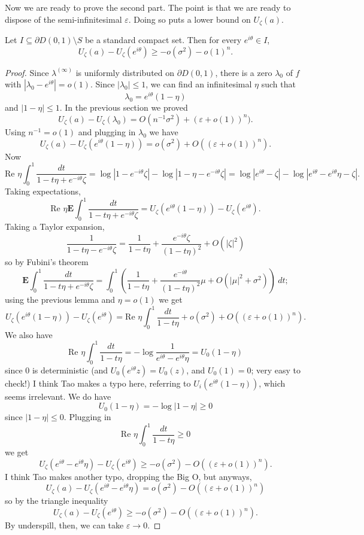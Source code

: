 \documentclass[12pt]{article}
\begin{document}
Now we are ready to prove the second part.
The point is that we are ready to dispose of the semi-infinitesimal $\varepsilon$.
Doing so puts a lower bound on $U_\zeta(a)$.
\begin{lemma}
Let $I \subseteq \partial D(0, 1) \setminus S$ be a standard compact set. Then for every $e^{i\theta} \in I$,
$$U_\zeta(a) - U_\zeta(e^{i\theta}) \geq -o(\sigma^2) - o(1)^n.$$
\end{lemma}
\begin{proof}
Since $\lambda^{(\infty)}$ is uniformly distributed on $\partial D(0, 1)$, there is a zero $\lambda_0$ of $f$ with $|\lambda_0 - e^{i\theta}| = o(1)$.
Since $|\lambda_0| \leq 1$, we can find an infinitesimal $\eta$ such that
$$\lambda_0 = e^{i\theta}(1 - \eta)$$
and $|1 - \eta| \leq 1$.
In the previous section we proved
$$U_\zeta(a) - U_\zeta(\lambda_0) = O(n^{-1}\sigma^2) + (\varepsilon + o(1))^n).$$
Using $n^{-1} = o(1)$ and plugging in $\lambda_0$ we have
$$U_\zeta(a) - U_\zeta(e^{i\theta}(1 - \eta)) = o(\sigma^2) + O((\varepsilon + o(1))^n).$$
Now
$$\text{Re } \eta \int_0^1 \frac{dt}{1 - t\eta + e^{-i\theta}\zeta} = \log |1 - e^{-i\theta}\zeta| - \log|1 - \eta - e^{-i\theta}\zeta| = \log|e^{i\theta} - \zeta| - \log|e^{i\theta} - e^{i\theta}\eta - \zeta|.$$
Taking expectations,
$$\text{Re }\eta \mathbf E\int_0^1 \frac{dt}{1 - t\eta + e^{-i\theta}\zeta} = U_\zeta(e^{i\theta}(1 - \eta)) - U_\zeta(e^{i\theta}).$$
Taking a Taylor expansion,
$$\frac{1}{1 - t\eta - e^{-i\theta}\zeta} = \frac{1}{1 - t\eta} + \frac{e^{-i\theta}\zeta}{(1 - t\eta)^2} + O(|\zeta|^2)$$
so by Fubini's theorem
$$\mathbf E\int_0^1 \frac{dt}{1 - t\eta + e^{-i\theta}\zeta} = \int_0^1 \left(\frac{1}{1 - t\eta} + \frac{e^{-i\theta}}{(1 - t\eta)^2}\mu + O(|\mu|^2 + \sigma^2)\right)~dt;$$
using the previous lemma and $\eta = o(1)$ we get
$$ U_\zeta(e^{i\theta}(1 - \eta)) - U_\zeta(e^{i\theta}) = \text{Re }\eta \int_0^1 \frac{dt}{1 - t\eta} + o(\sigma^2) + O((\varepsilon + o(1))^n).$$
We also have
$$\text{Re } \eta \int_0^1 \frac{dt}{1 - t\eta} = -\log \frac{1}{e^{i\theta} - e^{i\theta}\eta} = U_0(1 - \eta)$$
since $0$ is deterministic (and $U_0(e^{i\theta} z) = U_0(z)$, and $U_0(1) = 0$; very easy to check!)
I think Tao makes a typo here, referring to $U_i(e^{i\theta}(1 - \eta))$, which seems irrelevant. We do have
$$U_0(1 - \eta) = -\log|1 - \eta| \geq 0$$
since $|1 - \eta| \leq 0$. Plugging in
$$\text{Re } \eta \int_0^1 \frac{dt}{1 - t\eta} \geq 0$$
we get
$$U_\zeta(e^{i\theta} - e^{i\theta}\eta) - U_\zeta(e^{i\theta}) \geq -o(\sigma^2) - O((\varepsilon + o(1))^n).$$
I think Tao makes another typo, dropping the Big O, but anyways,
$$U_\zeta(a) - U_\zeta(e^{i\theta} - e^{i\theta}\eta) = o(\sigma^2) - O((\varepsilon + o(1))^n)$$
so by the triangle inequality
$$U_\zeta(a) - U_\zeta(e^{i\theta}) \geq -o(\sigma^2) - O((\varepsilon + o(1))^n).$$
By underspill, then, we can take $\varepsilon \to 0$.
\end{proof}
\end{document}
